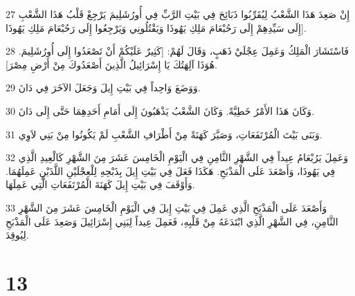 \par 27 إِنْ صَعِدَ هَذَا الشَّعْبُ لِيُقَرِّبُوا ذَبَائِحَ فِي بَيْتِ الرَّبِّ فِي أُورُشَلِيمَ يَرْجِعْ قَلْبُ هَذَا الشَّعْبِ إِلَى سَيِّدِهِمْ إِلَى رَحُبْعَامَ مَلِكِ يَهُوذَا وَيَقْتُلُونِي وَيَرْجِعُوا إِلَى رَحُبْعَامَ مَلِكِ يَهُوذَا].
\par 28 فَاسْتَشَارَ الْمَلِكُ وَعَمِلَ عِجْلَيْ ذَهَبٍ، وَقَالَ لَهُمْ: [كَثِيرٌ عَلَيْكُمْ أَنْ تَصْعَدُوا إِلَى أُورُشَلِيمَ. هُوَذَا آلِهَتُكَ يَا إِسْرَائِيلُ الَّذِينَ أَصْعَدُوكَ مِنْ أَرْضِ مِصْرَ].
\par 29 وَوَضَعَ وَاحِداً فِي بَيْتِ إِيلَ وَجَعَلَ الآخَرَ فِي دَانَ.
\par 30 وَكَانَ هَذَا الأَمْرُ خَطِيَّةً. وَكَانَ الشَّعْبُ يَذْهَبُونَ إِلَى أَمَامِ أَحَدِهِمَا حَتَّى إِلَى دَانَ.
\par 31 وَبَنَى بَيْتَ الْمُرْتَفَعَاتِ، وَصَيَّرَ كَهَنَةً مِنْ أَطْرَافِ الشَّعْبِ لَمْ يَكُونُوا مِنْ بَنِي لاَوِي.
\par 32 وَعَمِلَ يَرُبْعَامُ عِيداً فِي الشَّهْرِ الثَّامِنِ فِي الْيَوْمِ الْخَامِسَ عَشَرَ مِنَ الشَّهْرِ كَالْعِيدِ الَّذِي فِي يَهُوذَا، وَأَصْعَدَ عَلَى الْمَذْبَحِ. هَكَذَا فَعَلَ فِي بَيْتِ إِيلَ بِذَبْحِهِ لِلْعِجْلَيْنِ اللَّذَيْنِ عَمِلَهُمَا. وَأَوْقَفَ فِي بَيْتِ إِيلَ كَهَنَةَ الْمُرْتَفَعَاتِ الَّتِي عَمِلَهَا.
\par 33 وَأَصْعَدَ عَلَى الْمَذْبَحِ الَّذِي عَمِلَ فِي بَيْتِ إِيلَ فِي الْيَوْمِ الْخَامِسَ عَشَرَ مِنَ الشَّهْرِ الثَّامِنِ، فِي الشَّهْرِ الَّذِي ابْتَدَعَهُ مِنْ قَلْبِهِ، فَعَمِلَ عِيداً لِبَنِي إِسْرَائِيلَ وَصَعِدَ عَلَى الْمَذْبَحِ لِيُوقِدَ.

\chapter{13}

